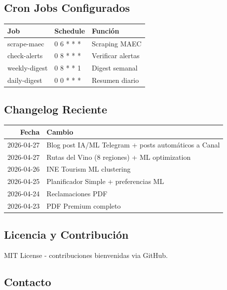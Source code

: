 \documentclass[11pt]{article}
\begin{document}
\subsection{Cron Jobs Configurados}
\label{sec:orgffcf73c}

\begin{center}
\begin{tabular}{lll}
Job & Schedule & Función\\
\hline
scrape-maec & 0 6 * * * & Scraping MAEC\\
check-alerts & 0 8 * * * & Verificar alertas\\
weekly-digest & 0 8 * * 1 & Digest semanal\\
daily-digest & 0 0 * * * & Resumen diario\\
\end{tabular}
\end{center}

\subsection{Changelog Reciente}
\label{sec:orgb63290f}

\begin{center}
\begin{tabular}{rl}
Fecha & Cambio\\
\hline
2026-04-27 & Blog post IA/ML Telegram + posts automáticos a Canal\\
2026-04-27 & Rutas del Vino (8 regiones) + ML optimization\\
2026-04-26 & INE Tourism ML clustering\\
2026-04-25 & Planificador Simple + preferencias ML\\
2026-04-24 & Reclamaciones PDF\\
2026-04-23 & PDF Premium completo\\
\end{tabular}
\end{center}

\subsection{Licencia y Contribución}
\label{sec:org80be6ab}

MIT License - contribuciones bienvenidas via GitHub.

\subsection{Contacto}
\label{sec:org82e12bc}
\end{document}
